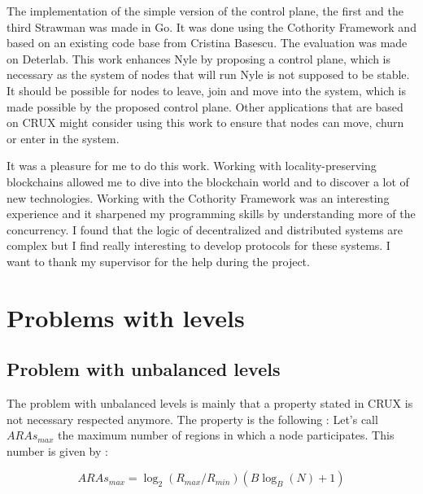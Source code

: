 \documentclass[a4paper,11pt,oneside]{report}
\begin{document}

The implementation of the simple version of the control plane, the first and
the third Strawman was made in Go. It was done using the Cothority Framework
and based on an existing code base from Cristina Basescu. The evaluation was
made on Deterlab. This work enhances Nyle by proposing a control plane, which
is necessary as the system of nodes that will run Nyle is not supposed to be stable. It should be possible for nodes to leave, join and move into the
system, which is made possible by the proposed control plane. Other
applications that are based on CRUX \cite{Basescu2014} might consider using
this work to ensure that nodes can move, churn or enter in the system.

It was a pleasure for me to do this work. Working with locality-preserving
blockchains allowed me to dive into the blockchain world and to discover a lot
of new technologies. Working with the Cothority Framework was an interesting
experience and it sharpened my programming skills by understanding more of the
concurrency. I found that the logic of decentralized and distributed systems
are complex but I find really interesting to develop protocols for these
systems. I want to thank my supervisor for the help during the project.


\cleardoublepage {} {}
\printbibliography


\appendix %

\chapter{Problems with levels}

\section{Problem with unbalanced levels } \label{app:unbalanced-levels}
The problem with unbalanced levels is mainly that a property stated in CRUX \cite{Basescu2014} is not necessary respected anymore. The property is the following : Let's call $ARAs_{max}$ the maximum number of regions in which a node participates. This number is given by : 

\begin{equation} \label{eq:ARAmax}
ARAs_{max} = \log_2(R_{max}/R_{min}) (B \log_B(N)+1)
\end{equation}
\end{document}
